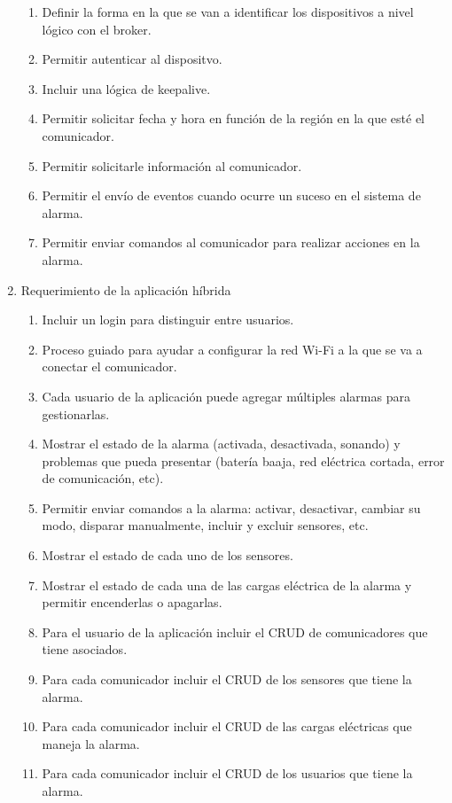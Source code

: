 \documentclass[
11pt, %
codirector, %
]{charter}
\begin{document}
\begin{enumerate}
		\begin{enumerate}
			\item Definir la forma en la que se van a identificar los dispositivos a nivel lógico con el broker.
			\item Permitir autenticar al dispositvo.
			\item Incluir una lógica de keepalive.
			\item Permitir solicitar fecha y hora en función de la región en la que esté el comunicador.
			\item Permitir solicitarle información al comunicador.
			\item Permitir el envío de eventos cuando ocurre un suceso en el sistema de alarma.
			\item Permitir enviar comandos al comunicador para realizar acciones en la alarma.
		\end{enumerate}
	\item Requerimiento de la aplicación híbrida
		\begin{enumerate}
			\item Incluir un login para distinguir entre usuarios.
			\item Proceso guiado para ayudar a configurar la red Wi-Fi a la que se va a conectar el comunicador.
			\item Cada usuario de la aplicación puede agregar múltiples alarmas para gestionarlas.
			\item Mostrar el estado de la alarma (activada, desactivada, sonando) y problemas que pueda presentar (batería baaja, red eléctrica cortada, error de comunicación, etc).
			\item Permitir enviar comandos a la alarma: activar, desactivar, cambiar su modo, disparar manualmente, incluir y excluir sensores, etc.
			\item Mostrar el estado de cada uno de los sensores.
			\item Mostrar el estado de cada una de las cargas eléctrica de la alarma y permitir encenderlas o apagarlas.
			\item Para el usuario de la aplicación incluir el CRUD de comunicadores que tiene asociados.
			\item Para cada comunicador incluir el CRUD de los sensores que tiene la alarma.
			\item Para cada comunicador incluir el CRUD de las cargas eléctricas que maneja la alarma.
			\item Para cada comunicador incluir el CRUD de los usuarios que tiene la alarma.
		\end{enumerate}

\end{enumerate}
\end{document}
